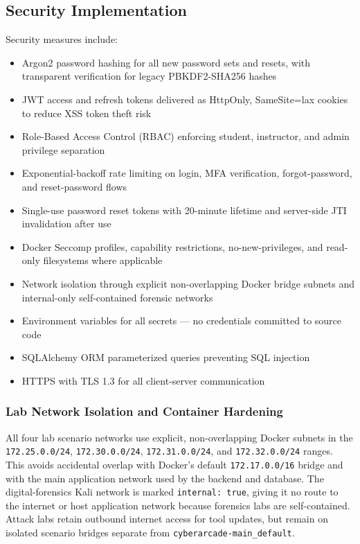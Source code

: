 \documentclass[12pt,a4paper]{report}
\begin{document}
\subsection{Security Implementation}

Security measures include:
\begin{itemize}
  \item Argon2 password hashing for all new password sets and resets, with transparent verification for legacy PBKDF2-SHA256 hashes
  \item JWT access and refresh tokens delivered as HttpOnly, SameSite=lax cookies to reduce XSS token theft risk
  \item Role-Based Access Control (RBAC) enforcing student, instructor, and admin privilege separation
  \item Exponential-backoff rate limiting on login, MFA verification, forgot-password, and reset-password flows
  \item Single-use password reset tokens with 20-minute lifetime and server-side JTI invalidation after use
  \item Docker Seccomp profiles, capability restrictions, no-new-privileges, and read-only filesystems where applicable
  \item Network isolation through explicit non-overlapping Docker bridge subnets and internal-only self-contained forensic networks
  \item Environment variables for all secrets --- no credentials committed to source code
  \item SQLAlchemy ORM parameterized queries preventing SQL injection
  \item HTTPS with TLS 1.3 for all client-server communication
\end{itemize}

\subsubsection{Lab Network Isolation and Container Hardening}

All four lab scenario networks use explicit, non-overlapping Docker subnets in the \texttt{172.25.0.0/24}, \texttt{172.30.0.0/24}, \texttt{172.31.0.0/24}, and \texttt{172.32.0.0/24} ranges. This avoids accidental overlap with Docker's default \texttt{172.17.0.0/16} bridge and with the main application network used by the backend and database. The digital-forensics Kali network is marked \texttt{internal: true}, giving it no route to the internet or host application network because forensics labs are self-contained. Attack labs retain outbound internet access for tool updates, but remain on isolated scenario bridges separate from \texttt{cyberarcade-main\_default}.
\end{document}
